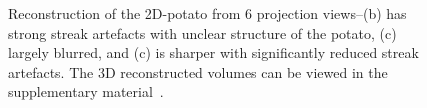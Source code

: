 \documentclass[journal]{IEEEtran}
\begin{document}
\begin{figure}[!h]
\centering
{}
\caption{Reconstruction of the 2D-potato from 6 projection views--(b) has strong streak artefacts with unclear structure of the potato, (c) largely blurred, and (c) is sharper with significantly reduced streak artefacts. The 3D reconstructed volumes can be viewed in the supplementary material~\cite{supp_paper}.}
\label{fig:potato_2D_results}
\end{figure}
\end{document}
